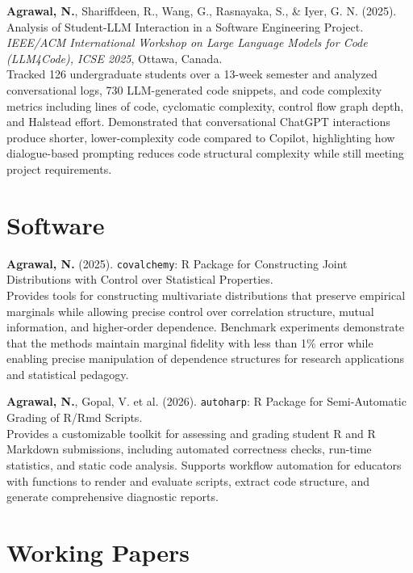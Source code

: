 \documentclass[10pt,a4paper]{article}
\begin{document}
\vspace{5pt}

\textbf{Agrawal, N.}, Shariffdeen, R., Wang, G., Rasnayaka, S., \& Iyer, G. N. (2025). Analysis of Student-LLM Interaction in a Software Engineering Project. \textit{IEEE/ACM International Workshop on Large Language Models for Code (LLM4Code), ICSE 2025}, Ottawa, Canada.\\
{\small Tracked 126 undergraduate students over a 13-week semester and analyzed conversational logs, 730 LLM-generated code snippets, and code complexity metrics including lines of code, cyclomatic complexity, control flow graph depth, and Halstead effort. Demonstrated that conversational ChatGPT interactions produce shorter, lower-complexity code compared to Copilot, highlighting how dialogue-based prompting reduces code structural complexity while still meeting project requirements.}

\section{Software}

\textbf{Agrawal, N.} (2025). \texttt{covalchemy}: R Package for Constructing Joint Distributions with Control over Statistical Properties.\\
{\small Provides tools for constructing multivariate distributions that preserve empirical marginals while allowing precise control over correlation structure, mutual information, and higher-order dependence. Benchmark experiments demonstrate that the methods maintain marginal fidelity with less than 1\% error while enabling precise manipulation of dependence structures for research applications and statistical pedagogy.}

\vspace{5pt}

\textbf{Agrawal, N.}, Gopal, V. et al. (2026). \texttt{autoharp}: R Package for Semi-Automatic Grading of R/Rmd Scripts.\\
{\small Provides a customizable toolkit for assessing and grading student R and R Markdown submissions, including automated correctness checks, run-time statistics, and static code analysis. Supports workflow automation for educators with functions to render and evaluate scripts, extract code structure, and generate comprehensive diagnostic reports.}

\section{Working Papers}
\end{document}
